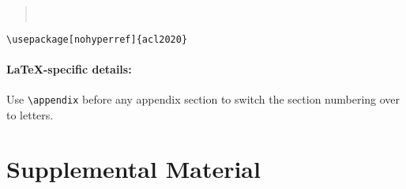 \documentclass[11pt,a4paper]{article}
\begin{document}
\begin{quote}\small
\verb||\\
\verb||
\end{quote}


\noindent
{\small\verb|\usepackage[nohyperref]{acl2020}|}






\appendix

\paragraph{\LaTeX-specific details:}
Use {\small\verb|\appendix|} before any appendix section to switch the section numbering over to letters.


\section{Supplemental Material}
\end{document}
